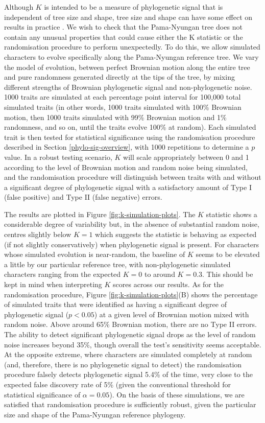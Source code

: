Although \(K\) is intended to be a measure of phylogenetic signal that is independent of tree size and shape, tree size and shape can have some effect on results in practice \autocite{munkemuller_how_2012}. We wish to check that the Pama-Nyungan tree does not contain any unusual properties that could cause either the K statistic or the randomisation procedure to perform unexpectedly. To do this, we allow simulated characters to evolve specifically along the Pama-Nyungan reference tree. We vary the model of evolution, between perfect Brownian motion along the entire tree and pure randomness generated directly at the tips of the tree, by mixing different strengths of Brownian phylogenetic signal and non-phylogenetic noise. 1000 traits are simulated at each percentage point interval for 100,000 total simulated traits (in other words, 1000 traits simulated with 100\% Brownian motion, then 1000 traits simulated with 99\% Brownian motion and 1\% randomness, and so on, until the traits evolve 100\% at random). Each simulated trait is then tested for statistical significance using the randomisation procedure described in Section \ref{phylo-sig-overview}, with 1000 repetitions to determine a \(p\) value. In a robust testing scenario, \(K\) will scale appropriately between 0 and 1 according to the level of Brownian motion and random noise being simulated, and the randomisation procedure will distinguish between traits with and without a significant degree of phylogenetic signal with a satisfactory amount of Type I (false positive) and Type II (false negative) errors.

The results are plotted in Figure \ref{fig:k-simulation-plots}. The \(K\) statistic shows a considerable degree of variability but, in the absence of substantial random noise, centres slightly below \(K=1\) which suggests the statistic is behaving as expected (if not slightly conservatively) when phylogenetic signal is present. For characters whose simulated evolution is near-random, the baseline of \(K\) seems to be elevated a little by our particular reference tree, with non-phylogenetic simulated characters ranging from the expected \(K=0\) to around \(K=0.3\). This should be kept in mind when interpreting \(K\) scores across our results. As for the randomisation procedure, Figure \ref{fig:k-simulation-plots}(B) shows the percentage of simulated traits that were identified as having a significant degree of phylogenetic signal (\(p < 0.05\)) at a given level of Brownian motion mixed with random noise. Above around 65\% Brownian motion, there are no Type II errors. The ability to detect significant phylogenetic signal drops as the level of random noise increases beyond 35\%, though overall the test's sensitivity seems acceptable. At the opposite extreme, where characters are simulated completely at random (and, therefore, there is no phylogenetic signal to detect) the randomisation procedure falsely detects phylogenetic signal 5.4\% of the time, very close to the expected false discovery rate of 5\% (given the conventional threshold for statistical significance of \(\alpha = 0.05\)). On the basis of these simulations, we are satisfied that randomisation procedure is sufficiently robust, given the particular size and shape of the Pama-Nyungan reference phylogeny.


